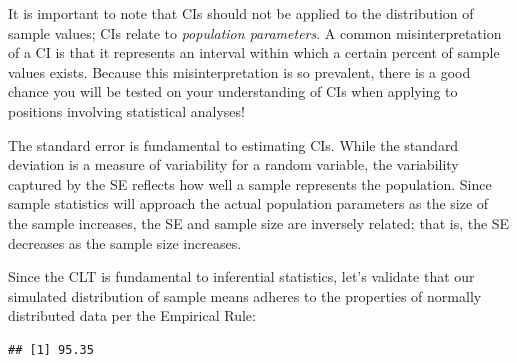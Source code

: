 \documentclass[
]{book}
\newenvironment{Shaded}{\begin{snugshade}}{\end{snugshade}}
\newcommand{\CommentTok}[1]{\textcolor[rgb]{0.56,0.35,0.01}{\textit{#1}}}
\newcommand{\DecValTok}[1]{\textcolor[rgb]{0.00,0.00,0.81}{#1}}
\newcommand{\FunctionTok}[1]{\textcolor[rgb]{0.00,0.00,0.00}{#1}}
\newcommand{\NormalTok}[1]{#1}
\newcommand{\OtherTok}[1]{\textcolor[rgb]{0.56,0.35,0.01}{#1}}
\newcommand{\SpecialCharTok}[1]{\textcolor[rgb]{0.00,0.00,0.00}{#1}}
\newcommand{\StringTok}[1]{\textcolor[rgb]{0.31,0.60,0.02}{#1}}
\begin{document}
It is important to note that CIs should not be applied to the distribution of sample values; CIs relate to \emph{population parameters}. A common misinterpretation of a CI is that it represents an interval within which a certain percent of sample values exists. Because this misinterpretation is so prevalent, there is a good chance you will be tested on your understanding of CIs when applying to positions involving statistical analyses!

The standard error is fundamental to estimating CIs. While the standard deviation is a measure of variability for a random variable, the variability captured by the SE reflects how well a sample represents the population. Since sample statistics will approach the actual population parameters as the size of the sample increases, the SE and sample size are inversely related; that is, the SE decreases as the sample size increases.

Since the CLT is fundamental to inferential statistics, let's validate that our simulated distribution of sample means adheres to the properties of normally distributed data per the Empirical Rule:

\begin{Shaded}
\end{Shaded}

\begin{verbatim}
## [1] 95.35
\end{verbatim}
\end{document}
